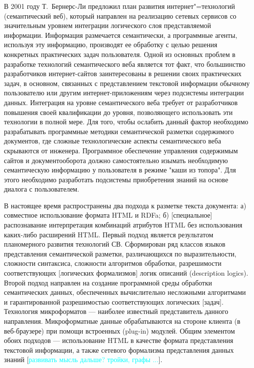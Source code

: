 \documentclass[utf8]{../IncArticle}
\newcommand{\e}[2][fcolor]{\textcolor{pcolor}{[}\textcolor{#1}{#2}\textcolor{pcolor}{]}}
\begin{document}
\introduction{}

В 2001 году Т.~Бернерс-Ли предложил план развития интернет"=технологий
(семантический веб), который направлен на реализацию сетевых сервисов
со значительным уровнем интеграции логического слоя представляемой
информации.  Информация размечается семантически, а программные
агенты, используя эту информацию, производят ее обработку с целью
решения конкретных практических задач пользователя. Одной из основных
проблем в разработке технологий семантического веба является тот факт,
что большинство разработчиков интернет-сайтов заинтересованы в решении
своих практических задач, в основном, связанных с представлением
текстовой информации обычному пользователю или другим
интернет-приложениям через подсистемы интеграции данных.  Интеграция
на уровне семантического веба требует от разработчиков повышения своей
квалификации до уровня, позволяющего использовать эти технологии в
полной мере.  Для того, чтобы ослабить данный фактор необходимо
разрабатывать программные методики семантической разметки содержимого
документов, где сложные технологические аспекты семантического веба
скрываются от инженера.  Программное обеспечение управления содержимым
сайтов и документооборота должно самостоятельно изымать необходимую
семантическую информацию у пользователя в режиме "каши из топора".
Для этого необходимо разработать подсистемы приобретения знаний на
основе диалога с пользователем.

В настоящее время распространены два подхода к разметке текста
документа: а) совместное использование формата HTML и RDFa; б)
\e{специальное} распознавание интерпретация комбинаций атрибутов HTML
без использования каких-либо расширений HTML.  Первый подход является
результатом планомерного развития технологий СВ.  Сформирован ряд
классов языков представления семантической
разметки, различающихся по выразительности, сложности синтаксиса,
сложности алгоритмов обработки, разрешимости соответствующих
\e{логических формализмов} логик описаний (description logics).
Второй подход направлен на создание программной среды обработки
семантических данных, обеспеченных вычислительно несложными
алгоритмами и гарантированной разрешимостью соответствующих логических
\e{задач}.  Технология микроформатов \cite{b2:2} --- наиболее
известный представитель данного направления.  Микроформатные данные
обрабатываются на стороне клиента (в веб-браузере) при помощи
встроенных (plug-in) модулей.  Общим элементом обоих подходов ---
использование HTML в качестве формата представления текстовой
информации, а также сетевого формализма представления данных знаний
\e[cyan]{развивать мысль дальше? тройки, графы ...}.
\end{document}
